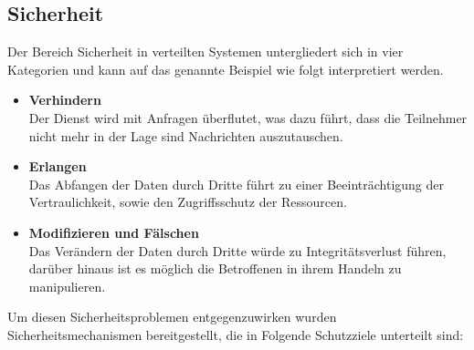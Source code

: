 \documentclass[a4paper]{scrartcl}
\begin{document}
\subsection{Sicherheit}
Der Bereich Sicherheit in verteilten Systemen untergliedert sich in vier Kategorien und kann auf das genannte Beispiel wie folgt interpretiert werden.
	\begin{itemize}
	
		\item \textbf{Verhindern} \\ 
		Der Dienst wird mit Anfragen überflutet, was dazu führt, dass die Teilnehmer nicht mehr in der Lage sind Nachrichten auszutauschen.
		
		\item \textbf{Erlangen} \\ 
		Das Abfangen der Daten durch Dritte führt zu einer Beeinträchtigung der Vertraulichkeit, sowie den Zugriffsschutz der Ressourcen.
		
		\item \textbf{Modifizieren und Fälschen} \\ 
		Das Verändern der Daten durch Dritte würde zu Integritätsverlust führen, darüber hinaus ist es möglich die Betroffenen in ihrem Handeln zu manipulieren.
		
	\end{itemize}
Um diesen Sicherheitsproblemen entgegenzuwirken wurden Sicherheitsmechanismen bereitgestellt, die in Folgende Schutzziele unterteilt sind:
\end{document}
